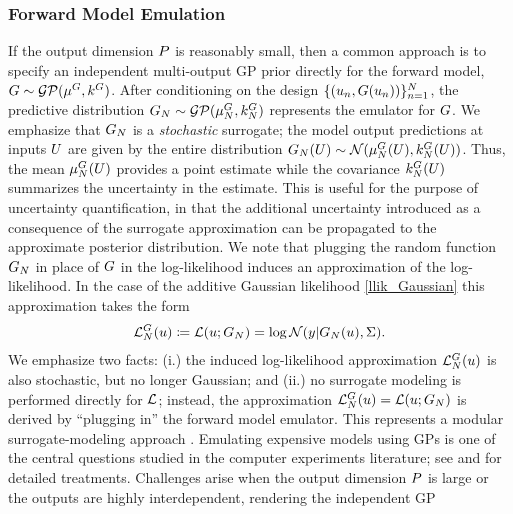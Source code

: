 \documentclass[12pt]{article}
\begin{document}
\subsubsection{Forward Model Emulation}
If the output dimension $\dimObs$ is reasonably small, then a common approach is to specify an independent 
multi-output GP prior directly for the forward model, $\fwd \sim \GP(\emMeanPrior{\fwd}, \emKerPrior{\fwd})$. After 
conditioning on the design $\{(\Par_{\idxDesign}, \fwd(\Par_{\idxDesign}))\}_{\idxDesign=1}^{\Ndesign}$, 
the predictive distribution $\fwdEm[\Ndesign] \sim \GP(\emMean[\Ndesign]{\fwd}, \emKer[\Ndesign]{\fwd})$ 
represents the emulator for $\fwd$. We emphasize that $\fwdEm[\Ndesign]$ is a \textit{stochastic} surrogate; 
the model output predictions at inputs $\parMat$ are given by the entire distribution 
$\fwdEm[\Ndesign](\parMat) \sim \Gaussian(\emMean[\Ndesign]{\fwd}(\parMat), \emKer[\Ndesign]{\fwd}(\parMat))$. 
Thus, the mean $\emMean[\Ndesign]{\fwd}(\parMat)$ provides a point estimate while the covariance 
$\emKer[\Ndesign]{\fwd}(\parMat)$ summarizes the uncertainty in the estimate. This is useful for the purpose
of uncertainty quantification, in that the additional uncertainty introduced as a consequence of the surrogate 
approximation can be propagated to the approximate posterior distribution. We note that plugging the random 
function $\fwdEm[\Ndesign]$ in place of $\fwd$ in the log-likelihood induces an approximation of the log-likelihood. 
In the case of the additive Gaussian likelihood \ref{llik_Gaussian} this approximation takes the form 
\begin{align}
\llikEmFwd(\Par) \Def \llik(\Par; \fwdEm) =  \log\Gaussian(\obs| \fwdEm[\Ndesign](\Par), \likPar). \label{induced_llik_emulator}
\end{align}
We emphasize two facts: (i.) the induced log-likelihood approximation $\llikEmFwd[\Ndesign](\Par)$ is also 
stochastic, but no longer Gaussian; and (ii.) no surrogate modeling is performed directly for $\llik$; instead, 
the approximation $\llikEmFwd[\Ndesign](\Par) = \llik(\Par; \fwdEm[\Ndesign])$ is derived by ``plugging in'' the 
forward model emulator. This represents a modular surrogate-modeling approach \cite{modularization}. 
Emulating expensive models using GPs is one of the central questions 
studied in the computer experiments literature; see \cite{gramacy2020surrogates} and 
\cite{design_analysis_computer_experiments} for detailed treatments. Challenges arise when the output
dimension $\dimObs$ is large or the outputs are highly interdependent, rendering the independent GP 
\end{document}
